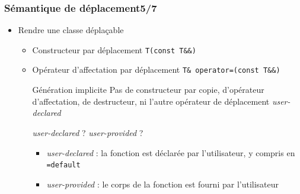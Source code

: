 \documentclass[C++.tex]{subfiles}
\begin{document}
\begin{frame}
	\frametitle{Sémantique de déplacement\titlehfill{}5/7}
	\begin{itemize}
		\item Rendre une classe déplaçable
		\begin{itemize}
			\item Constructeur par déplacement \lstinline|T(const T&&)|
			\item Opérateur d'affectation par déplacement \lstinline|T& operator=(const T&&)|

			\begin{block}{Génération implicite}
				Pas de constructeur par copie, d'opérateur d'affectation, de destructeur, ni l'autre \og opérateur\fg{} de déplacement \textit{user-declared}
			\end{block}
		
			\begin{alertblock}{\textit{user-declared} ? \textit{user-provided} ?}
				\begin{itemize}
					\item \textit{user-declared} : la fonction est déclarée par l'utilisateur, y compris en \lstinline|=default| 
					\item \textit{user-provided} : le corps de la fonction est fourni par l'utilisateur

				\end{itemize}
			\end{alertblock}
		\end{itemize}
	\end{itemize}
\end{frame}
\end{document}
